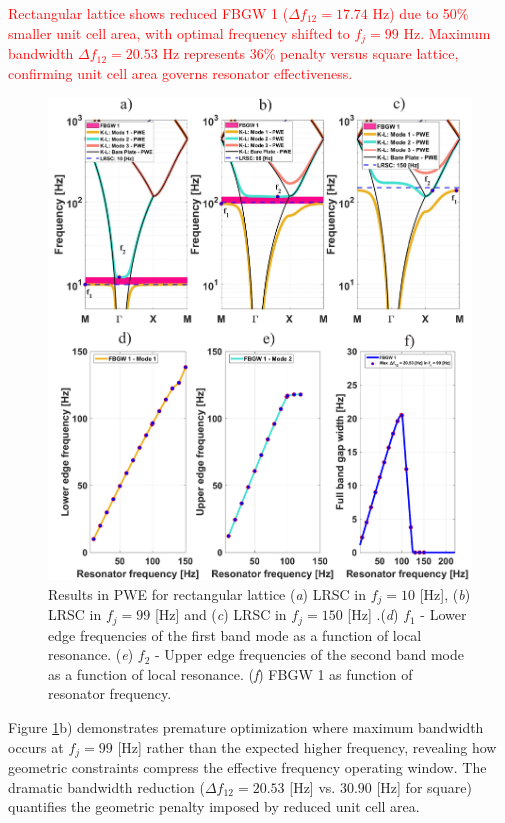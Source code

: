\documentclass[review,numbers,sort&compress]{elsarticle}
\begin{document}
\textcolor{red}{Rectangular lattice shows reduced FBGW 1 ($\Delta f_{12} = 17.74$ Hz) due to 50\% smaller unit cell area, with optimal frequency shifted to $f_j = 99$ Hz. Maximum bandwidth $\Delta f_{12} = 20.53$ Hz represents 36\% penalty versus square lattice, confirming unit cell area governs resonator effectiveness.}
\newpage
\begin{figure}[htb]
	\centering
	\includegraphics[width=.9\textwidth]{2_2_disp_frf_rect.pdf}
	\caption{Results in PWE for rectangular lattice (\textit{a}) LRSC in $f_j=10$ [Hz], (\textit{b}) LRSC in $f_j=99$ [Hz] and (\textit{c}) LRSC in $f_j=150$ [Hz] .(\textit{d}) $f_1$ -  Lower edge frequencies of the first band mode as a function of local resonance. (\textit{e}) $f_2$ -  Upper edge frequencies of the second band mode as a function of local resonance. (\textit{f}) FBGW 1 as function of resonator frequency.}
	\label{pwe_disp_rect_all_res}
\end{figure}
Figure \ref{pwe_disp_rect_all_res}b) demonstrates premature optimization where maximum bandwidth occurs at $f_j = 99$ [Hz] rather than the expected higher frequency, revealing how geometric constraints compress the effective frequency operating window. The dramatic bandwidth reduction ($\Delta f_{12} = 20.53$ [Hz] vs. $30.90$ [Hz] for square) quantifies the geometric penalty imposed by reduced unit cell area.
\end{document}
